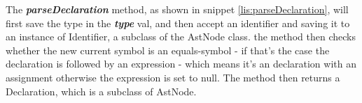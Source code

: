 The \textbf{\textit{parseDeclaration}} method, as shown in snippet \ref{lis:parseDeclaration}, will first save the type in the \textbf{\textit{type}} val, and then accept an identifier and saving it to an instance of Identifier, a subclass of the AstNode class. the method then checks whether the new current symbol is an equals-symbol - if that's the case the declaration is followed by an expression - which means it's an declaration with an assignment otherwise the expression is set to null. The method then returns a Declaration, which is a subclass of AstNode.  




